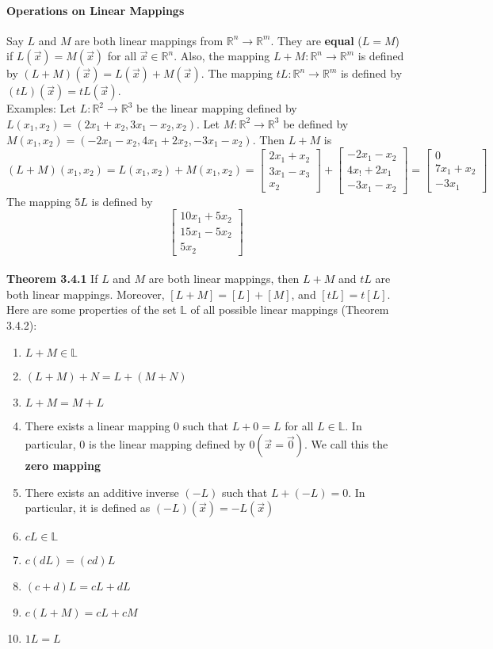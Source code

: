 \documentclass[10pt,letter]{article}
\begin{document}
\paragraph{Operations on Linear Mappings} Say $L$ and $M$ are both linear mappings from $\mathbb{R}^n\rightarrow\mathbb{R}^m$. They are \textbf{equal} ($L=M$) if $L(\vec{x})=M(\vec{x})$ for all $\vec{x}\in\mathbb{R}^n$. Also, the mapping $L+M:\mathbb{R}^n\rightarrow\mathbb{R}^m$ is defined by $(L+M)(\vec{x})=L(\vec{x})+M(\vec{x})$. The mapping $tL:\mathbb{R}^n\rightarrow\mathbb{R}^m$ is defined by $(tL)(\vec{x})=tL(\vec{x})$. \\ 
Examples: Let $L:\mathbb{R}^2\rightarrow\mathbb{R}^3$ be the linear mapping defined by $L(x_1,x_2)=(2x_1+x_2,3x_1-x_2,x_2)$. Let $M:\mathbb{R}^2\rightarrow\mathbb{R}^3$ be defined by $M(x_1,x_2)=(-2x_1-x_2,4x_1+2x_2,-3x_1-x_2)$. Then $L+M$ is $$(L+M)(x_1,x_2)=L(x_1,x_2)+M(x_1,x_2)=\begin{bmatrix}2x_1+x_2\\3x_1-x_3\\x_2\end{bmatrix}+\begin{bmatrix}-2x_1-x_2\\4x_!+2x_1\\-3x_1-x_2\end{bmatrix}=\begin{bmatrix}0\\7x_1+x_2\\-3x_1\end{bmatrix}$$ The mapping $5L$ is defined by $$\begin{bmatrix}10x_1+5x_2\\15x_1-5x_2\\5x_2\end{bmatrix}$$ \\ 
\textbf{Theorem 3.4.1} If $L$ and $M$ are both linear mappings, then $L+M$ and $tL$ are both linear mappings. Moreover, $[L+M]=[L]+[M]$, and $[tL]=t[L]$. \\ 
Here are some properties of the set $\mathbb{L}$ of all possible linear mappings (Theorem 3.4.2): \begin{enumerate}
    \item $L+M\in\mathbb{L}$ 
    \item $(L+M)+N=L+(M+N)$ 
    \item $L+M=M+L$ 
    \item There exists a linear mapping $0$ such that $L+0=L$ for all $L\in\mathbb{L}$. In particular, $0$ is the linear mapping defined by $0(\vec{x}=\vec{0})$. We call this the \textbf{zero mapping} 
    \item There exists an additive inverse $(-L)$ such that $L+(-L)=0$. In particular, it is defined as $(-L)(\vec{x})=-L(\vec{x})$ 
    \item $cL\in\mathbb{L}$ 
    \item $c(dL)=(cd)L$ 
    \item $(c+d)L=cL+dL$ 
    \item $c(L+M) = cL+cM$ 
    \item $1L=L$
\end{enumerate}
\end{document}
